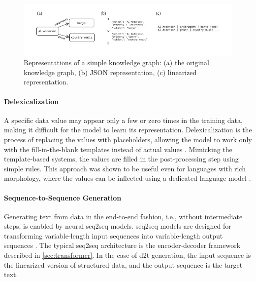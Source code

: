 {\begin{figure}[h]
    \centering
    \includegraphics[width=\textwidth]{img/linearization.pdf}

    \caption{Representations of a simple knowledge graph: (a) the original knowledge graph, (b) JSON representation, (c) linearized representation.}\label{fig:linearization}

\end{figure}


\paragraph{Delexicalization} A specific data value may appear only a few or zero times in the training data, making it difficult for the model to learn its representation. Delexicalization is the process of replacing the values with placeholders, allowing the model to work only with the fill-in-the-blank templates instead of actual values \cite{oh2000stochastic,mairesse2010phrase,wen2015semantically,dusekSequencetoSequenceGenerationSpoken2016}. Mimicking the template-based systems, the values are filled in the post-processing step using simple rules. This approach was shown to be useful even for languages with rich morphology, where the values can be inflected using a dedicated language model \cite{duvsek2019neural}.

\paragraph{Sequence-to-Sequence Generation} Generating text from data in the end-to-end fashion, i.e., without intermediate steps, is enabled by neural \ac{seq2seq} models. \Ac{seq2seq} models are designed for transforming variable-length input sequences into variable-length output sequences \cite{cho2014learning,sutskever2014sequence}. The typical \ac{seq2seq} architecture is the encoder-decoder framework described in \autoref{sec:transformer}. In the case of \ac{d2t} generation, the input sequence is the linearized version of structured data, and the output sequence is the target text.

}
